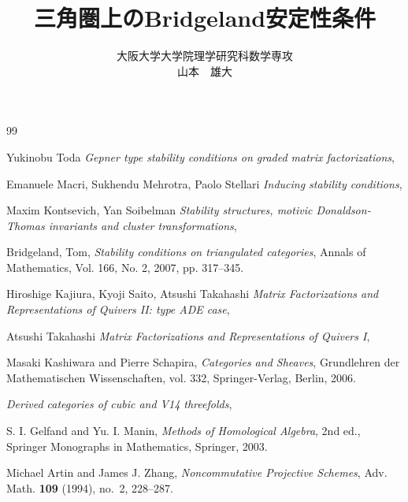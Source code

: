 \documentclass[eqno]{ltjsarticle}
\begin{document}
\title{三角圏上のBridgeland安定性条件}
\date{}
\author{大阪大学大学院理学研究科数学専攻\\山本　雄大}
\maketitle
\tableofcontents













\begin{thebibliography}{99}

	Yukinobu Toda
		\textit{Gepner type stability conditions on graded matrix factorizations},

Emanuele Macri, Sukhendu Mehrotra, Paolo Stellari
		\textit{Inducing stability conditions},
	
	Maxim Kontsevich, Yan Soibelman
		\textit{Stability structures, motivic Donaldson-Thomas invariants and cluster transformations},

	Bridgeland, Tom,
		\textit{Stability conditions on triangulated categories},
	Annals of Mathematics, Vol. 166, No. 2, 2007, pp. 317–345.


	Hiroshige Kajiura, Kyoji Saito, Atsushi Takahashi
		\textit{Matrix Factorizations and Representations of Quivers II: type ADE case},

	 Atsushi Takahashi
		\textit{Matrix Factorizations and Representations of Quivers I},

	Masaki Kashiwara and Pierre Schapira,
		\textit{Categories and Sheaves},
	Grundlehren der Mathematischen Wissenschaften, vol. 332,
	Springer-Verlag, Berlin, 2006.

	\textit{Derived categories of cubic and V14 threefolds},

	S. I. Gelfand and Yu. I. Manin,
	\textit{Methods of Homological Algebra}, 2nd ed.,
	Springer Monographs in Mathematics, Springer, 2003.

	Michael Artin and James J. Zhang,
	\textit{Noncommutative Projective Schemes},
	Adv. Math. \textbf{109} (1994), no.~2, 228--287.


\end{thebibliography}
\end{document}
